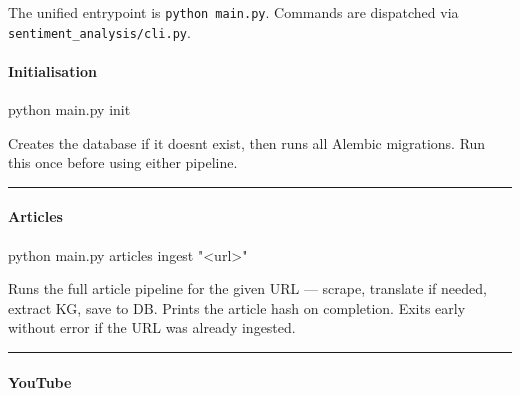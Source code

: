 \documentclass[
]{article}
\newenvironment{Shaded}{}{}
\newcommand{\ExtensionTok}[1]{#1}
\newcommand{\NormalTok}[1]{#1}
\newcommand{\StringTok}[1]{\textcolor[rgb]{0.25,0.44,0.63}{#1}}
\begin{document}
The unified entrypoint is \texttt{python\ main.py}. Commands are
dispatched via \texttt{sentiment\_analysis/cli.py}.

\paragraph{Initialisation}\label{initialisation}

\begin{Shaded}
\begin{Highlighting}[]
\ExtensionTok{python}\NormalTok{ main.py init}
\end{Highlighting}
\end{Shaded}

Creates the database if it doesn\textquotesingle t exist, then runs all
Alembic migrations. Run this once before using either pipeline.

\begin{center}\rule{0.5\linewidth}{0.5pt}\end{center}

\paragraph{Articles}\label{articles}

\begin{Shaded}
\begin{Highlighting}[]
\ExtensionTok{python}\NormalTok{ main.py articles ingest }\StringTok{"\textless{}url\textgreater{}"}
\end{Highlighting}
\end{Shaded}

Runs the full article pipeline for the given URL --- scrape, translate
if needed, extract KG, save to DB. Prints the article hash on
completion. Exits early without error if the URL was already ingested.

\begin{center}\rule{0.5\linewidth}{0.5pt}\end{center}

\paragraph{YouTube}\label{youtube}
\end{document}
